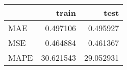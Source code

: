 \begin{tabular}{lrr}
\toprule
{} &      train &       test \\
\midrule
MAE  &   0.497106 &   0.495927 \\
MSE  &   0.464884 &   0.461367 \\
MAPE &  30.621543 &  29.052931 \\
\bottomrule
\end{tabular}
